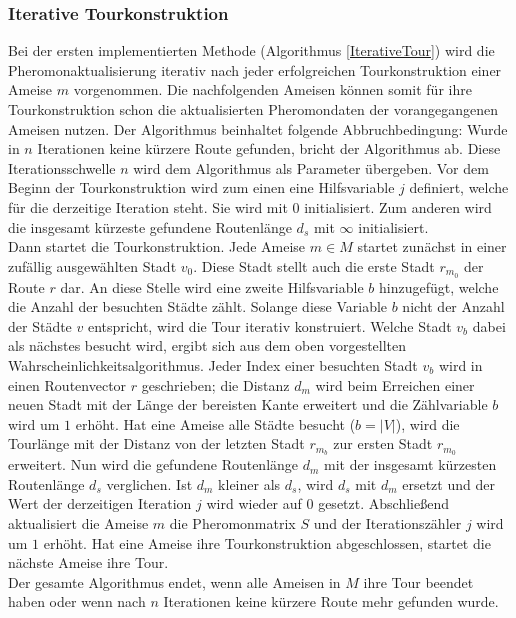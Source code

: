 \documentclass[doktyp=barbeit, sprache=german]{TUBAFarbeiten}
\begin{document}
\subsubsection{Iterative Tourkonstruktion}
Bei der ersten implementierten Methode (Algorithmus \ref{IterativeTour}) wird die Pheromonaktualisierung iterativ nach jeder erfolgreichen Tourkonstruktion einer Ameise $m$ vorgenommen. Die nachfolgenden Ameisen können somit für ihre Tourkonstruktion schon die aktualisierten Pheromondaten der vorangegangenen Ameisen nutzen. Der Algorithmus beinhaltet folgende Abbruchbedingung: Wurde in $n$ Iterationen keine kürzere Route gefunden, bricht der Algorithmus ab. Diese Iterationsschwelle $n$ wird dem Algorithmus als Parameter übergeben. Vor dem Beginn der Tourkonstruktion wird zum einen eine Hilfsvariable $j$ definiert, welche für die derzeitige Iteration steht. Sie wird mit $0$ initialisiert. Zum anderen wird die insgesamt kürzeste gefundene Routenlänge $d_s$ mit $\infty$ initialisiert. 
\\Dann startet die Tourkonstruktion. Jede Ameise $m \in M$ startet zunächst in einer zufällig ausgewählten Stadt $v_0$. Diese Stadt stellt auch die erste Stadt $r_{m_0}$ der Route $r$ dar. An diese Stelle wird eine zweite Hilfsvariable $b$ hinzugefügt, welche die Anzahl der besuchten Städte zählt. Solange diese Variable $b$ nicht der Anzahl der Städte $v$ entspricht, wird die Tour iterativ konstruiert. Welche Stadt $v_b$ dabei als nächstes besucht wird, ergibt sich aus dem oben vorgestellten Wahrscheinlichkeitsalgorithmus. Jeder Index einer besuchten Stadt $v_b$ wird in einen Routenvector $r$ geschrieben; die Distanz $d_m$ wird beim Erreichen einer neuen Stadt mit der Länge der bereisten Kante erweitert und die Zählvariable $b$ wird um $1$ erhöht. Hat eine Ameise alle Städte besucht ($b = |V|$), wird die Tourlänge mit der Distanz von der letzten Stadt $r_{m_b}$ zur ersten Stadt $r_{m_0}$ erweitert. Nun wird die gefundene Routenlänge $d_m$ mit der insgesamt kürzesten Routenlänge $d_s$ verglichen. Ist $d_m$ kleiner als $d_s$, wird $d_s$ mit $d_m$ ersetzt und der Wert der derzeitigen Iteration $j$ wird wieder auf $0$ gesetzt. Abschließend aktualisiert die Ameise $m$ die Pheromonmatrix $S$ und der Iterationszähler $j$ wird um $1$ erhöht. Hat eine Ameise ihre Tourkonstruktion abgeschlossen, startet die nächste Ameise ihre Tour.
\\Der gesamte Algorithmus endet, wenn alle Ameisen in $M$ ihre Tour beendet haben oder wenn nach  $n$ Iterationen keine kürzere Route mehr gefunden wurde. 
\end{document}
